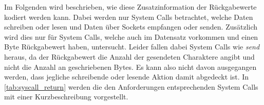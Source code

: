                     Im Folgenden wird beschrieben, wie diese Zusatzinformation der Rückgabewerte kodiert werden kann.
                    Dabei werden nur System Calls betrachtet, welche Daten schreiben oder lesen und Daten über Sockets empfangen oder senden. 
                    Zusätzlich wird dies nur für System Calls, welche auch im Datensatz vorkommen und einen Byte Rückgabewert haben, untersucht.
                    Leider fallen dabei System Calls wie \textit{send} heraus, da der Rückgabewert die Anzahl der gesendeten Charaktere angibt und nicht die Anzahl an geschriebenen Bytes.
                    Es kann also nicht davon ausgegangen werden, dass jegliche schreibende oder lesende Aktion damit abgedeckt ist.
                    In \autoref{tab:syscall_return} werden die den Anforderungen entsprechenden System Calls mit einer Kurzbeschreibung vorgestellt.

